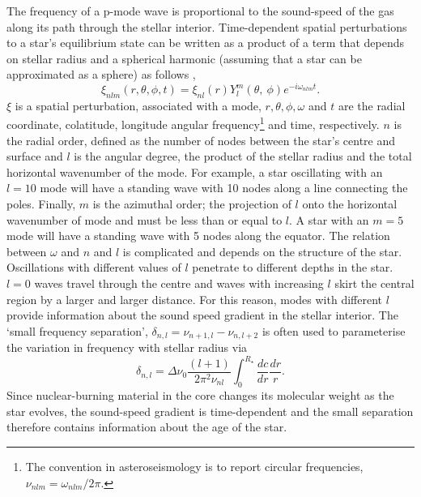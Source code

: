 The frequency of a p-mode wave is proportional to the sound-speed of the gas
along its path through the stellar interior.
Time-dependent spatial perturbations to a star's equilibrium state can be
written as a product of a term that depends on stellar radius and a spherical
harmonic (assuming that a star can be approximated as a sphere) as follows
\citep{Brown1994},
\begin{equation}
    \xi_{nlm}(r, \theta, \phi, t) = \xi_{nl}(r)Y_l^m(\theta, \
    \phi)e^{-i\omega_{nlm}t}.
\end{equation}
$\xi$ is a spatial perturbation, associated with a mode, $r, \theta, \phi,
\omega$ and $t$ are the radial coordinate, colatitude, longitude angular
frequency\footnote{The convention in asteroseismology is to report circular
frequencies, $\nu_{nlm} = \omega_{nlm}/2\pi$.} and time, respectively.
$n$ is the radial order, defined as the number of nodes between the star's
centre and surface and $l$ is the angular degree, the product of the stellar
radius and the total horizontal wavenumber of the mode.
For example, a star oscillating with an $l = 10$ mode will have a standing
wave with 10 nodes along a line connecting the poles.
Finally, $m$ is the azimuthal order; the projection of $l$ onto the horizontal
wavenumber of mode and must be less than or equal to $l$.
A star with an $m = 5$ mode will have a standing wave with 5 nodes along the
equator.
The relation between $\omega$ and $n$ and $l$ is complicated and depends on the
structure of the star.
Oscillations with different values of $l$ penetrate to different depths in the
star.
$l = 0$ waves travel through the centre and waves with increasing $l$ skirt
the central region by a larger and larger distance.
For this reason, modes with different $l$ provide information about the sound
speed gradient in the stellar interior.
The `small frequency separation', $\delta_{n,l} = \nu_{n+1, l} - \nu_{n, l+2}$
is often used to parameterise the variation in frequency with stellar radius
via \citep{Brown1994}
\begin{equation}
    \delta_{n,l} = \Delta\nu_0\frac{(l + 1)}{2\pi^2\nu_{nl}}\int_0^{R_\star}
    \frac{dc}{dr}\frac{dr}{r}.
\end{equation}
Since nuclear-burning material in the core changes its molecular weight as the
star evolves, the sound-speed gradient is time-dependent and the small
separation therefore contains information about the age of the star.


